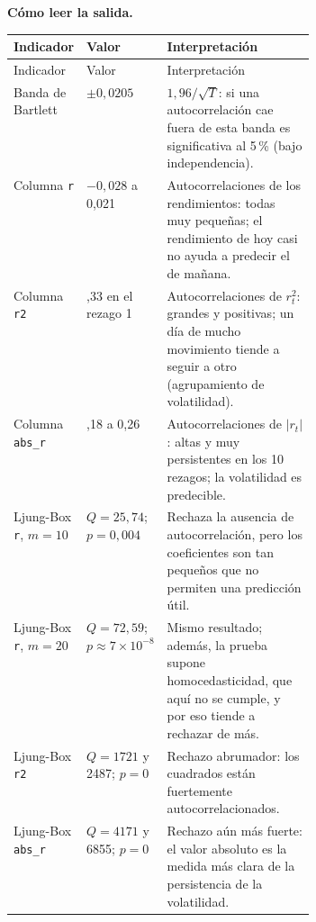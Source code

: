 \par\medskip\noindent\textbf{Cómo leer la salida.}
{\small\setlength{\tabcolsep}{4pt}\renewcommand{\arraystretch}{1.15}
\begin{xltabular}{\linewidth}{@{}>{\raggedright\arraybackslash}p{0.24\linewidth}>{\raggedleft\arraybackslash}p{0.15\linewidth}>{\raggedright\arraybackslash}X@{}}
\toprule Indicador & Valor & Interpretación \\ \midrule \endfirsthead
\toprule Indicador & Valor & Interpretación \\ \midrule \endhead
\bottomrule \endlastfoot
Banda de Bartlett & $\pm0{,}0205$ & $1{,}96/\sqrt T$: si una autocorrelación cae fuera de esta banda es significativa al 5\,\% (bajo independencia). \\
Columna \texttt{r} & $-0{,}028$ a 0,021 & Autocorrelaciones de los rendimientos: todas muy pequeñas; el rendimiento de hoy casi no ayuda a predecir el de mañana. \\
Columna \texttt{r2} & 0,33 en el rezago 1 & Autocorrelaciones de $r_t^2$: grandes y positivas; un día de mucho movimiento tiende a seguir a otro (agrupamiento de volatilidad). \\
Columna \texttt{abs\_r} & 0,18 a 0,26 & Autocorrelaciones de $\lvert r_t\rvert$: altas y muy persistentes en los 10 rezagos; la volatilidad es predecible. \\
Ljung-Box \texttt{r}, $m=10$ & $Q=25{,}74$; $p=0{,}004$ & Rechaza la ausencia de autocorrelación, pero los coeficientes son tan pequeños que no permiten una predicción útil. \\
Ljung-Box \texttt{r}, $m=20$ & $Q=72{,}59$; $p\approx7\times10^{-8}$ & Mismo resultado; además, la prueba supone homocedasticidad, que aquí no se cumple, y por eso tiende a rechazar de más. \\
Ljung-Box \texttt{r2} & $Q=1721$ y 2487; $p=0$ & Rechazo abrumador: los cuadrados están fuertemente autocorrelacionados. \\
Ljung-Box \texttt{abs\_r} & $Q=4171$ y 6855; $p=0$ & Rechazo aún más fuerte: el valor absoluto es la medida más clara de la persistencia de la volatilidad. \\
\end{xltabular}}
